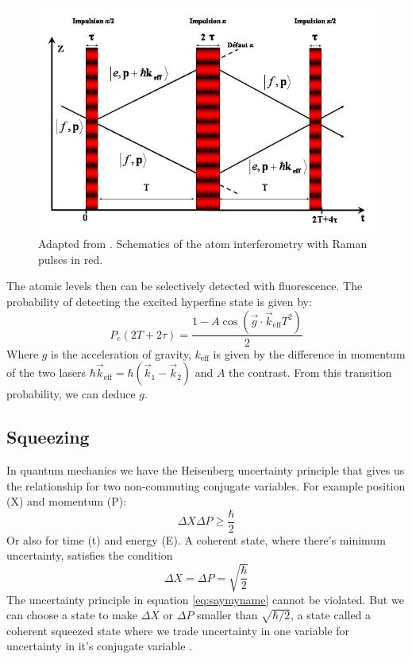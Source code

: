 \documentclass[english, a4paper, 11pt]{article}
\begin{document}
\begin{figure}
    \centering
    \includegraphics[width=1\linewidth]{figures/interferometry.png}
    \caption{Adapted from \cite{cheinet2006conception}. Schematics of the atom interferometry with Raman pulses in red.}
    \label{fig:interf}
\end{figure}

The atomic levels then can be selectively detected with fluorescence. The probability of detecting the excited hyperfine state is given by:
\begin{equation}
P_e(2T+2\tau)= \frac{1- A\cos(\overrightarrow g\cdot \overrightarrow k_{\mathrm{eff}}T^2)}{2}
\end{equation}
Where $g$ is the acceleration of gravity, $k_{\mathrm{eff}}$ is given by the difference in momentum of the two lasers $\hbar \overrightarrow k_{\mathrm{eff}}= \hbar(\overrightarrow k_1-\overrightarrow k_2)$ and $A$ the contrast. From this transition probability, we can deduce $g$\cite{dos2008gravimetre}.



\subsection{Squeezing}
In quantum mechanics we have the Heisenberg uncertainty principle that gives us the relationship for two non-commuting conjugate variables.  For example position (X) and momentum (P):
\begin{equation}
    \Delta X \Delta P \ge \frac{\hbar}{2}
    \label{eq:saymyname}
\end{equation}
Or also for time (t) and energy (E). A coherent state, where there's minimum uncertainty, satisfies the  condition 
\begin{equation}
    \Delta X = \Delta P = \sqrt{\frac{\hbar}{2}}
\end{equation}
The uncertainty  principle in equation \ref{eq:saymyname} cannot be violated. But we can choose a state to make $\Delta X$ or $\Delta P$ smaller than $\sqrt{\hbar/2}$, a state called a coherent squeezed state where we trade uncertainty in one variable for uncertainty in it's conjugate variable
\cite{Ma_2011}. 
\end{document}
